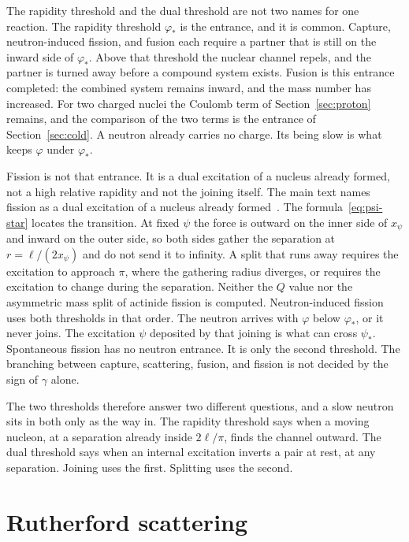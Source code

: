 \documentclass[a4paper]{article}
\begin{document}
The rapidity threshold and the dual threshold are not two names for one reaction. The rapidity threshold \(\varphi_*\) is the entrance, and it is common. Capture, neutron-induced fission, and fusion each require a partner that is still on the inward side of \(\varphi_*\). Above that threshold the nuclear channel repels, and the partner is turned away before a compound system exists. Fusion is this entrance completed: the combined system remains inward, and the mass number has increased. For two charged nuclei the Coulomb term of Section~\ref{sec:proton} remains, and the comparison of the two terms is the entrance of Section~\ref{sec:cold}. A neutron already carries no charge. Its being slow is what keeps \(\varphi\) under \(\varphi_*\).

Fission is not that entrance. It is a dual excitation of a nucleus already formed, not a high relative rapidity and not the joining itself. The main text names fission as a dual excitation of a nucleus already formed~\cite{dst-main}. The formula~\eqref{eq:psi-star} locates the transition. At fixed \(\psi\) the force is outward on the inner side of \(x_\psi\) and inward on the outer side, so both sides gather the separation at \(r=\ell/(2x_\psi)\) and do not send it to infinity. A split that runs away requires the excitation to approach \(\pi\), where the gathering radius diverges, or requires the excitation to change during the separation. Neither the \(Q\) value nor the asymmetric mass split of actinide fission is computed. Neutron-induced fission uses both thresholds in that order. The neutron arrives with \(\varphi\) below \(\varphi_*\), or it never joins. The excitation \(\psi\) deposited by that joining is what can cross \(\psi_*\). Spontaneous fission has no neutron entrance. It is only the second threshold. The branching between capture, scattering, fusion, and fission is not decided by the sign of \(\gamma\) alone.

The two thresholds therefore answer two different questions, and a slow neutron sits in both only as the way in. The rapidity threshold says when a moving nucleon, at a separation already inside \(2\ell/\pi\), finds the channel outward. The dual threshold says when an internal excitation inverts a pair at rest, at any separation. Joining uses the first. Splitting uses the second.

\section{Rutherford scattering}
\label{sec:rutherford}
\end{document}
